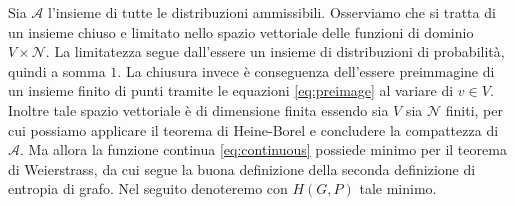 Sia \(\mathcal{A}\) l'insieme di tutte le distribuzioni ammissibili. Osserviamo che si tratta di un insieme chiuso e limitato nello spazio vettoriale delle funzioni di dominio \(V\times \mathcal{N}\). La limitatezza segue dall'essere un insieme di distribuzioni di probabilità, quindi a somma \(1\). La chiusura invece è conseguenza dell'essere preimmagine di un insieme finito di punti tramite le equazioni \eqref{eq:preimage} al variare di \(v\in V\). Inoltre tale spazio vettoriale è di dimensione finita essendo sia \(V\) sia \(\mathcal{N}\) finiti, per cui possiamo applicare il teorema di Heine-Borel e concludere la compattezza di \(\mathcal{A}\). Ma allora la funzione continua \eqref{eq:continuous} possiede minimo per il teorema di Weierstrass, da cui segue la buona definizione della seconda definizione di entropia di grafo. Nel seguito denoteremo con \(H(G,P)\) tale minimo.

